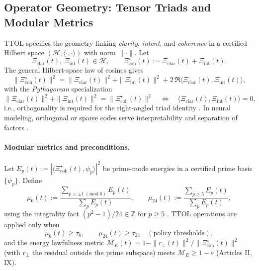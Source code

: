 \documentclass[12pt]{amsart}
\theoremstyle{plain}
\begin{document}
\subsection{Operator Geometry: Tensor Triads and Modular Metrics}
\noindent TTOL specifies the geometry linking \emph{clarity}, \emph{intent}, and \emph{coherence} in a certified Hilbert space $(\mathcal{H},\langle\cdot,\cdot\rangle)$ with norm $\|\cdot\|$.
Let
\[
\Xi_{\mathrm{clar}}(t),\ \Xi_{\mathrm{int}}(t)\in\mathcal{H},\qquad
\Xi_{\mathrm{coh}}^{\star}(t):=\Xi_{\mathrm{clar}}(t)+\Xi_{\mathrm{int}}(t).
\]
The general Hilbert-space law of cosines gives
\begin{equation}
\|\Xi_{\mathrm{coh}}^{\star}(t)\|^{2}
=\|\Xi_{\mathrm{clar}}(t)\|^{2}+\|\Xi_{\mathrm{int}}(t)\|^{2}
+2\,\Re\langle \Xi_{\mathrm{clar}}(t),\Xi_{\mathrm{int}}(t)\rangle,
\label{eq:ttol-law-of-cosines}
\end{equation}
with the \emph{Pythagorean} specialization
\begin{equation}
\|\Xi_{\mathrm{clar}}(t)\|^{2}+\|\Xi_{\mathrm{int}}(t)\|^{2}
=\|\Xi_{\mathrm{coh}}^{\star}(t)\|^{2}
\quad\Longleftrightarrow\quad
\langle \Xi_{\mathrm{clar}}(t),\Xi_{\mathrm{int}}(t)\rangle=0,
\label{eq:ttol-orth}
\end{equation}
i.e., orthogonality is required for the right-angled triad identity \cite{rudin1991functional,conway1990functional,lax2002functional}. In neural modeling, orthogonal or sparse codes serve interpretability and separation of factors \cite{olshausen1996emergence}.

\paragraph{Modular metrics and preconditions.}
Let $E_p(t):=|\langle \Xi_{\mathrm{coh}}^{\star}(t),\psi_p\rangle|^2$ be prime-mode energies in a certified prime basis $\{\psi_p\}$. Define
\[
\mu_6(t):=\frac{\sum_{p\equiv\pm1\ (\mathrm{mod}\ 6)}E_p(t)}{\sum_{p}E_p(t)},\qquad
\mu_{24}(t):=\frac{\sum_{p\ge5}E_p(t)}{\sum_{p}E_p(t)},
\]
using the integrality fact $(p^2-1)/24\in\mathbb{Z}$ for $p\ge5$ \cite[Ch.~5]{hardy2008introduction}. TTOL operations are applied only when
\[
\mu_6(t)\ge \tau_6,\qquad \mu_{24}(t)\ge \tau_{24}\quad(\text{policy thresholds}),
\]
and the energy lawfulness metric $\mathcal{M}_E(t)=1-\|r_\perp(t)\|^2/\|\Xi_{\mathrm{coh}}^{\star}(t)\|^2$ (with $r_\perp$ the residual outside the prime subspace) meets $\mathcal{M}_E\ge 1-\varepsilon$ (Articles II, IX).
\end{document}
